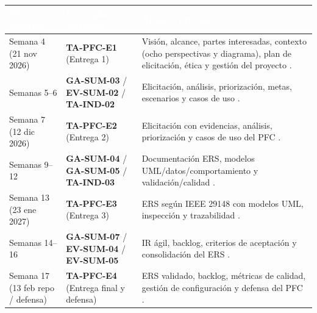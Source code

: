 \documentclass[11pt,a4paper]{article}
\begin{document}
\begin{tabularx}{\textwidth}{
    |>{\columncolor{azulclaro}\raggedright\arraybackslash}p{2.7cm}
    |>{\raggedright\arraybackslash}p{3.6cm}
    |>{\raggedright\arraybackslash}X|
}

\hline

\rowcolor{azul}
\textcolor{white}{\textbf{Hito / Semana}} &
\textcolor{white}{\textbf{Entregable o actividad}} &
\textcolor{white}{\textbf{Alcance principal}} \\

\hline

Semana 4 (21 nov 2026) &
\textbf{TA-PFC-E1} (Entrega 1) &
Visión, alcance, partes interesadas, contexto (ocho perspectivas y diagrama), plan de elicitación, ética y gestión del proyecto \cite{silabo_isr401}. \\

\hline

Semanas 5--6 &
\textbf{GA-SUM-03} / \textbf{EV-SUM-02} / \textbf{TA-IND-02} &
Elicitación, análisis, priorización, metas, escenarios y casos de uso \cite{silabo_isr401,pohl2015requirements}. \\

\hline

Semana 7 (12 dic 2026) &
\textbf{TA-PFC-E2} (Entrega 2) &
Elicitación con evidencias, análisis, priorización y casos de uso del PFC \cite{silabo_isr401,pohl2015requirements}. \\

\hline

Semanas 9--12 &
\textbf{GA-SUM-04} / \textbf{GA-SUM-05} / \textbf{TA-IND-03} &
Documentación ERS, modelos UML/datos/comportamiento y validación/calidad \cite{silabo_isr401,pohl2015requirements}. \\

\hline

Semana 13 (23 ene 2027) &
\textbf{TA-PFC-E3} (Entrega 3) &
ERS según IEEE 29148 con modelos UML, inspección y trazabilidad \cite{silabo_isr401,pohl2015requirements}. \\

\hline

Semanas 14--16 &
\textbf{GA-SUM-07} / \textbf{EV-SUM-04} / \textbf{EV-SUM-05} &
IR ágil, backlog, criterios de aceptación y consolidación del ERS \cite{silabo_isr401,pohl2015requirements}. \\

\hline

Semana 17 (13 feb repo / defensa) &
\textbf{TA-PFC-E4} (Entrega final y defensa) &
ERS validado, backlog, métricas de calidad, gestión de configuración y defensa del PFC \cite{silabo_isr401,pohl2015requirements}. \\

\hline

\end{tabularx}
\end{document}
